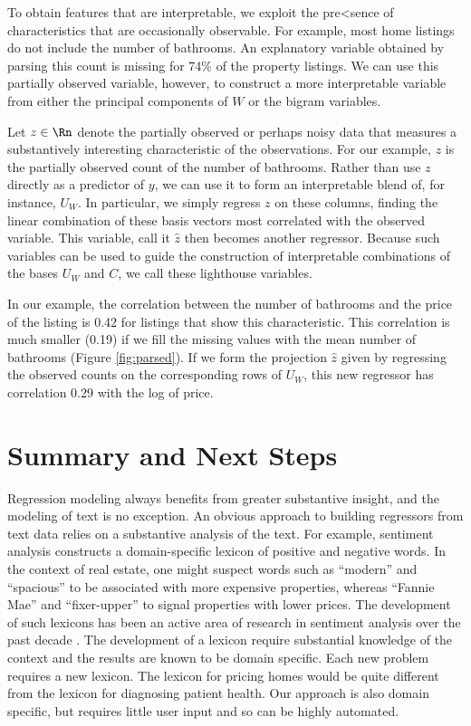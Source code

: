 \documentclass[12pt]{article}
\begin{document}
 To obtain features that are interpretable, we exploit the pre<sence of
 characteristics that are occasionally observable.  For example,
 most home listings do not include the number of bathrooms.  An
 explanatory variable obtained by parsing this count is missing for 74\% of the property listings.  We can use this partially observed variable, however, to construct a more interpretable variable from either the principal components of $W$ or the bigram variables.  


 Let $z \in \Rn$ denote the partially observed or perhaps noisy data
 that measures a substantively interesting characteristic of the
 observations.  For our example, $z$ is the partially observed count of the number of bathrooms.  Rather than use $z$ directly as a predictor of $y$, we
 can use it to form an interpretable blend of, for instance, $U_W$.   In
 particular, we simply regress $z$ on these columns, finding the
 linear combination of these basis vectors most correlated with the
 observed variable.  This variable, call it $\hat{z}$ then becomes
 another regressor.  Because such variables can be used to guide the
 construction of interpretable combinations of the bases $U_W$ and
 $C$, we call these lighthouse variables.  
 
 
 In our example, the correlation between the number of bathrooms and the price of the listing is 0.42 for listings that show this characteristic.  This correlation is much smaller (0.19) if we fill the missing values with the mean number of bathrooms (Figure  \ref{fig:parsed}).  If we form the projection $\hat{z}$ given by regressing the observed counts on the corresponding rows of $U_W$, this new regressor has correlation 0.29 with the log of price.



\section{Summary and Next Steps}
\label{sec:disc}
  
  Regression modeling always benefits from greater substantive insight, and the modeling of text is no exception.  An obvious approach to building regressors from text data relies on a
 substantive analysis of the text.  For example, sentiment analysis constructs a
 domain-specific lexicon of positive and negative words.  In the context of real
 estate, one might suspect  words such as ``modern'' and ``spacious''  to be associated with more expensive properties, whereas
 ``Fannie Mae'' and ``fixer-upper'' to signal properties with lower prices.  The
 development of such lexicons has been an active area of research in sentiment
 analysis over the past decade \citep{taboada11}.  The development of a lexicon
 require substantial knowledge of the context and the results are known to be
 domain specific.  Each new problem requires a new lexicon.  The lexicon for
 pricing homes would be quite different from the lexicon for diagnosing patient
 health.  Our approach is also domain specific, but requires little user input
 and so can be highly automated.
\end{document}
